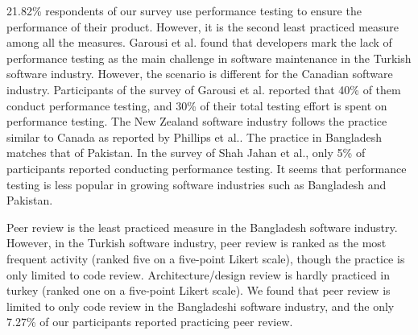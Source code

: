21.82\% respondents of our survey use performance testing to ensure the performance of their product.  However, it is the second least practiced measure among all the measures. Garousi et al.\citep{Garousi2015} found that developers mark the lack of performance testing as the main challenge in software maintenance in the Turkish software industry. However, the scenario is different for the Canadian software industry. Participants of the survey of Garousi et al.\citep{Garousi2013} reported that 40\% of them conduct performance testing, and 30\% of their total testing effort is spent on performance testing. The New Zealand software industry follows the practice similar to Canada as reported by Phillips et al.\citep{Phillips2003}. %
The practice in Bangladesh matches that of Pakistan. 
In the survey of Shah Jahan et al.\citep{Jahan2019}, only 5\% of participants reported conducting performance testing. It seems that performance testing is less popular in growing software industries such as Bangladesh and Pakistan.

Peer review is the least practiced measure in the Bangladesh software industry. However, in the Turkish software industry, peer review is ranked as the most frequent activity\citep{Garousi2015} (ranked five on a five-point Likert scale), though the practice is only limited to code review. Architecture/design review is hardly practiced in turkey (ranked one on a five-point Likert scale). We found that peer review is limited to only code review in the Bangladeshi software industry, and the only 7.27\% of our participants reported practicing peer review.

